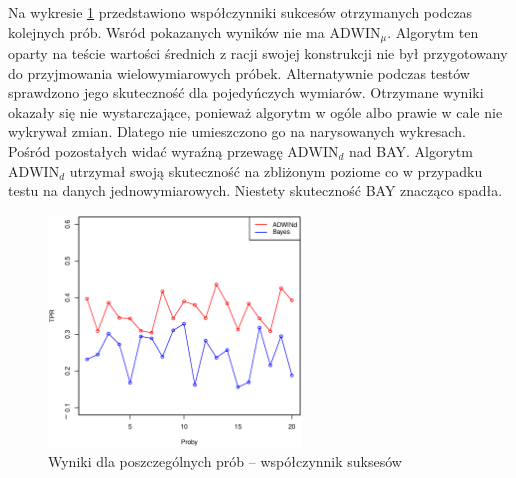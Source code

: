 Na wykresie \ref{fig:CovValuesResTpr} przedstawiono współczynniki sukcesów otrzymanych podczas kolejnych prób.
Wsród pokazanych wyników nie ma $\mbox{ADWIN}_\mu$.
Algorytm ten oparty na teście wartości średnich z racji swojej konstrukcji nie był przygotowany do przyjmowania wielowymiarowych próbek.
Alternatywnie podczas testów sprawdzono jego skuteczność dla pojedyńczych wymiarów.
Otrzymane wyniki okazały się nie wystarczające, ponieważ algorytm w ogóle albo prawie w cale nie wykrywał zmian.
Dlatego nie umieszczono go na narysowanych wykresach.
Pośród pozostałych widać wyraźną przewagę $\mbox{ADWIN}_d$ nad BAY.
Algorytm $\mbox{ADWIN}_d$ utrzymał swoją skuteczność na zbliżonym poziome co w przypadku testu na danych jednowymiarowych.
Niestety skuteczność BAY znacząco spadła.
\begin{figure}[htbp]
  \centering
  \includegraphics[width=0.6\textwidth]{img/ch-5-cov-res-tpr}
  \caption{Wyniki dla poszczególnych prób -- współczynnik suksesów}
  \label{fig:CovValuesResTpr}
\end{figure}

